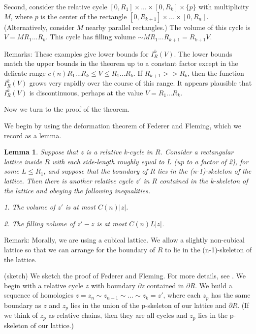 \documentclass{amsart}
\newtheorem*{Theorem 1}{Theorem 1}
\newtheorem*{Theorem 2}{Theorem 2}
\newtheorem*{Estimate 1}{Estimate 1}
\newtheorem*{Estimate 2}{Estimate 2}
\newtheorem*{key lemma}{Key Lemma}
\newtheorem{lemma}{Lemma}[section]
\numberwithin{equation}{section}
\begin{document}
Second, consider the relative cycle $[0,R_1]
\times ... \times [0, R_k] \times \{ p \}$ with multiplicity $M$, 
where $p$ is the center of the rectangle $[0, R_{k+1}] \times ...
\times [0, R_n]$.  (Alternatively, consider $M$ nearby parallel
rectangles.)  The volume of this cycle is $V = M R_1 ... R_k$. 
This cycle has filling volume $\sim M R_1 ... R_{k+1} = R_{k+1}
V$.

Remarks: These examples give lower bounds for $I^k_R(V)$.  The
lower bounds match the upper bounds in the theorem up to a
constant factor except in the delicate range $c(n) R_1 ... R_k
\le V \le R_1 ... R_k$. If $R_{k+1} >> R_k$, then the function
$I^k_R(V)$ grows very rapidly over the course of this range.  It
appears plausible that $I^k_R(V)$ is discontinuous, perhaps at the
value $V = R_1 ... R_k$.

Now we turn to the proof of the theorem.

\proof We begin by using the deformation theorem of Federer and
Fleming, which we record as a lemma.

\begin{lemma} Suppose that $z$ is a relative k-cycle in $R$.
Consider a rectangular lattice inside $R$ with each side-length
roughly equal to $L$ (up to a factor of 2), for some $L \le R_1$,
and suppose that the boundary of $R$ lies in the (n-1)-skeleton
of the lattice.  Then there is another relative cycle $z'$ in $R$
contained in the k-skeleton of the lattice and obeying the 
following inequalities.

1. The volume of $z'$ is at most $C(n) |z|$.

2. The filling volume of $z' - z$ is at most $C(n) L |z|$.

\end{lemma}

Remark: Morally, we are using a cubical lattice.  We allow a slightly
non-cubical lattice so that we can arrange for the boundary of $R$ 
to lie in the (n-1)-skeleton of the lattice.  

\proof (sketch) We sketch the proof of Federer and Fleming.  For
more details, see \cite{G3}.  We begin with a relative cycle $z$
with boundary $\partial z$ contained in $\partial R$.  We build a
sequence of homologies $z = z_n \sim z_{n-1} \sim ... \sim z_k =
z'$, where each $z_p$ has the same boundary as $z$ and $z_p$ lies
in the union of the p-skeleton of our lattice and $\partial R$. 
(If we think of $z_p$ as relative chains, then they are all
cycles and $z_p$ lies in the p-skeleton of our lattice.)
\end{document}
